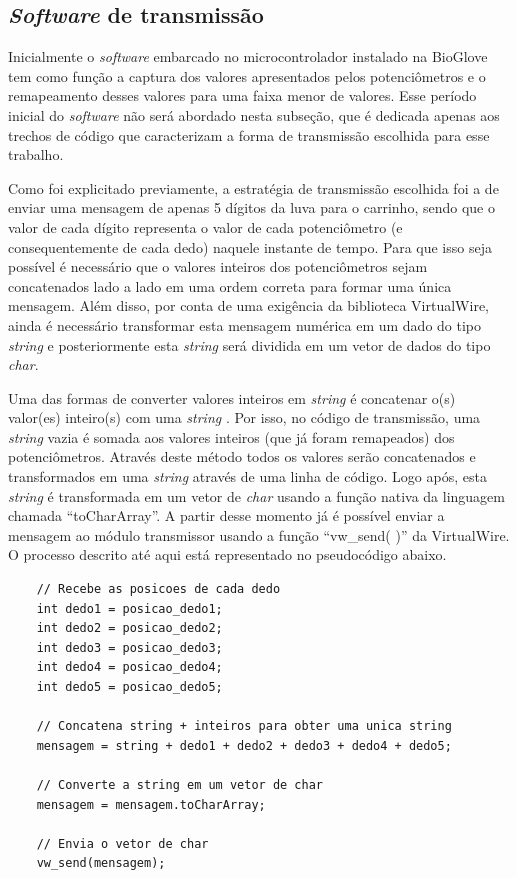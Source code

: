 \documentclass[
	12pt,				%
	openright,			%
	oneside,			%
	a4paper,			%
	english,			%
	brazil				%
	]{abntex2}
\begin{document}
		\subsection{\textit{Software} de transmissão}

		Inicialmente o \textit{software} embarcado no microcontrolador instalado na BioGlove tem como função a captura dos valores apresentados pelos potenciômetros e o remapeamento desses valores para uma faixa menor de valores. Esse período inicial do \textit{software} não será abordado nesta subseção, que é dedicada apenas aos trechos de código que caracterizam a forma de transmissão escolhida para esse trabalho.

		Como foi explicitado previamente, a estratégia de transmissão escolhida foi a de enviar uma mensagem de apenas 5 dígitos da luva para o carrinho, sendo que o valor de cada dígito representa o valor de cada potenciômetro (e consequentemente de cada dedo) naquele instante de tempo. Para que isso seja possível é necessário que o valores inteiros dos potenciômetros sejam concatenados lado a lado em uma ordem correta para formar uma única mensagem. Além disso, por conta de uma exigência da biblioteca VirtualWire, ainda é necessário transformar esta mensagem numérica em um dado do tipo \textit{string} e posteriormente esta \textit{string} será dividida em um vetor de dados do tipo \textit{char}.	
		
		Uma das formas de converter valores inteiros em \textit{string} é concatenar o(s) valor(es) inteiro(s) com uma \textit{string} \cite{arduinostringadd}. Por isso, no código de transmissão, uma \textit{string} vazia é somada aos valores inteiros (que já foram remapeados) dos potenciômetros. Através deste método todos os valores serão concatenados e transformados em uma \textit{string} através de uma linha de código. Logo após, esta \textit{string} é transformada em um vetor de \textit{char} usando a função nativa da linguagem chamada ``toCharArray''. A partir desse momento já é possível enviar a mensagem ao módulo transmissor usando a função ``vw\_send( )'' da VirtualWire. O processo descrito até aqui está representado no pseudocódigo abaixo.		
\begin{lstlisting}	
	// Recebe as posicoes de cada dedo
	int dedo1 = posicao_dedo1;
	int dedo2 = posicao_dedo2;
	int dedo3 = posicao_dedo3;
	int dedo4 = posicao_dedo4;
	int dedo5 = posicao_dedo5;

	// Concatena string + inteiros para obter uma unica string
	mensagem = string + dedo1 + dedo2 + dedo3 + dedo4 + dedo5;

	// Converte a string em um vetor de char
	mensagem = mensagem.toCharArray;

	// Envia o vetor de char
	vw_send(mensagem);
\end{lstlisting}
\end{document}
